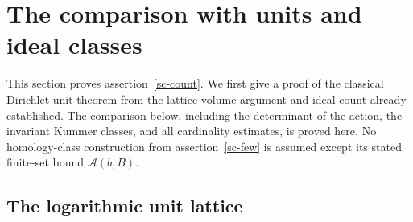 \section{The comparison with units and ideal classes}
\label{su-section}

This section proves assertion~\ref{sc-count}.  We first give
a proof of the classical Dirichlet unit theorem
\cite[Chapter 5]{milne-ant} from the lattice-volume argument
and ideal count already established.
The comparison below, including the determinant of the action,
the invariant Kummer classes, and all cardinality estimates, is
proved here.  No homology-class construction from
assertion~\ref{sc-few} is assumed except its stated finite-set
bound $\mathcal A(b,B)$.

\subsection{The logarithmic unit lattice}


